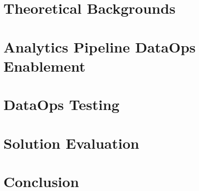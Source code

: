 	\chapter{Theoretical Backgrounds}


	\chapter{Analytics Pipeline DataOps Enablement}
	

	\chapter{DataOps Testing}
	

	\chapter{Solution Evaluation}
	
	
	\chapter{Conclusion}

		
		

	\pagestyle{plain}
	\clearpage
	\printbibliography
